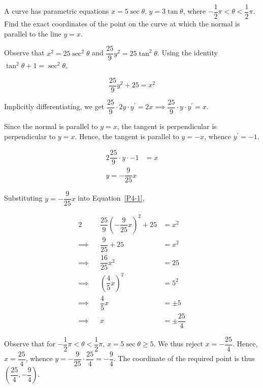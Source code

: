 \documentclass{jhwhw}
\begin{document}

    \problem{}
        A curve has parametric equations $x = 5\sec\theta, \, y = 3\tan\theta$, where $-\dfrac12\pi < \theta < \dfrac12\pi$. Find the exact coordinates of the point on the curve at which the normal is parallel to the line $y=x$.

    \solution
        Observe that $x^2 = 25\sec^2\theta$ and $\dfrac{25}9 y^2 = 25\tan^2\theta$. Using the identity $\tan^2\theta + 1 = \sec^2\theta$,

        \begin{equation}\label{P4-1}
            \dfrac{25}9 y^2 + 25 = x^2
        \end{equation}

        Implicitly differentiating, we get $\dfrac{25}9 \cdot 2y \cdot y^\prime = 2x \implies \dfrac{25}9 \cdot y \cdot y^\prime = x$.

        Since the normal is parallel to $y =x$, the tangent is perpendicular is perpendicular to $y=x$. Hence, the tangent is parallel to $y = -x$, whence $y^\prime = -1$.

        \begin{alignat*}{2}
            \dfrac{25}9 \cdot y \cdot -1 &= x\\
            y = -\dfrac{9}{25} x
        \end{alignat*}

        Substituting $y = -\dfrac9{25}x$ into Equation~\ref{P4-1},

        \begin{alignat*}{2}
            &&\dfrac{25}9 \left(-\dfrac9{25}x\right)^2+25 &= x^2\\
            \implies&&\dfrac{9}{25} + 25 &= x^2\\
            \implies&&\dfrac{16}{25}x^2 &= 25\\
            \implies&&\left(\dfrac45 x\right)^2 &= 5^2\\
            \implies&&\dfrac45 x &= \pm 5\\
            \implies&& x &= \pm \dfrac{25}4
        \end{alignat*}

        Observe that for $-\dfrac12\pi < \theta < \dfrac12\pi$, $x=5\sec\theta \geq 5$. We thus reject $x = -\dfrac{25}4$. Hence, $x=\dfrac{25}4$, whence $y = -\dfrac{9}{25} \cdot \dfrac{25}4 = -\dfrac{9}4$. The coordinate of the required point is thus $\left(\dfrac{25}4, -\dfrac94\right)$.
        
\end{document}
